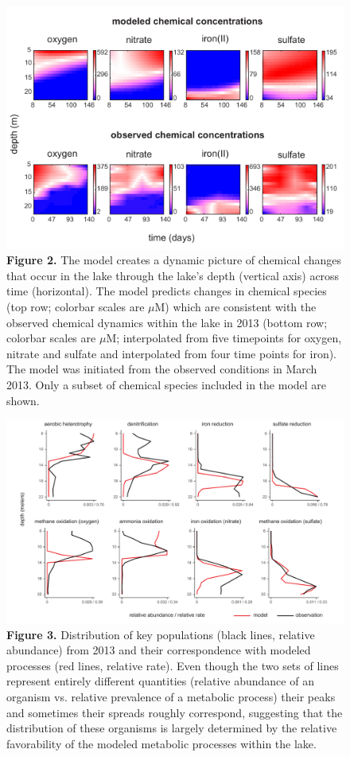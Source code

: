 \begin{figure}[ht]
\centering
\includegraphics{lake/fig/fig2}
\caption*{{\bf Figure 2.} The model creates a dynamic picture of chemical
changes that occur in the lake through the lake's depth (vertical axis) across
time (horizontal). The model predicts changes in chemical species (top row;
colorbar scales are $\mu$M) which are consistent with the observed chemical
dynamics within the lake in 2013 (bottom row; colorbar scales are $\mu$M;
interpolated from five timepoints for oxygen, nitrate and sulfate and
interpolated from four time points for iron). The model was initiated from the
observed conditions in March 2013. Only a subset of chemical species included
in the model are shown.}
\end{figure}

\begin{figure}[ht]
\centering
\includegraphics[width=\textwidth]{lake/fig/fig3}
\caption*{{\bf Figure 3.} Distribution of key populations (black lines,
relative abundance) from 2013 and their correspondence with modeled processes
(red lines, relative rate). Even though the two sets of lines represent
entirely different quantities (relative abundance of an organism vs. relative
prevalence of a metabolic process) their peaks and sometimes their spreads
roughly correspond, suggesting that the distribution of these organisms is
largely determined by the relative favorability of the modeled metabolic
processes within the lake.}
\end{figure}


